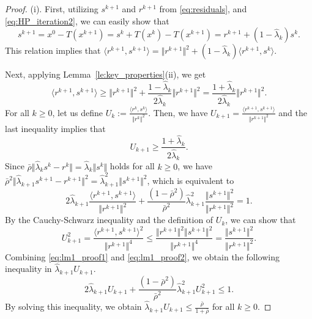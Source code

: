 \documentclass{article}
\theoremstyle{plain}
\theoremstyle{definition}
\newcommand{\norms}[1]{\Vert#1\Vert}
\newcommand{\iprods}[1]{\langle #1\rangle}
\newcommand{\0}{\boldsymbol{0}}
\begin{document}
\begin{proof}
(i). First, utilizing $s^{k+1}$ and $r^{k+1}$ from \eqref{eq:residuals}, and \eqref{eq:HP_iteration2}, we can easily show that
\begin{equation*}
s^{k+1} = x^0 - T(x^{k+1})  = s^k + T(x^k) - T(x^{k+1})  = r^{k+1} + (1 - \hat{\lambda}_k)s^k.
\end{equation*}	
This relation implies that $\iprods{ r^{k+1}, s^{k+1} } = \norms{ r^{k+1} }^2 + (1 - \hat{\lambda}_k)\iprods{ r^{k+1}, s^k}$.

Next, applying Lemma~\ref{le:key_properties}(ii), we get
\begin{equation*}
\iprods{ r^{k+1}, s^{k+1} }  \geq \norms{ r^{k+1} }^2 + \frac{1 - \hat{\lambda}_k}{ 2 \hat{\lambda}_k} \norms{ r^{k+1} }^2 = \frac{1 + \hat{\lambda}_k}{2\hat{\lambda}_k} \norms{ r^{k+1} }^2.
\end{equation*}
For all $k \geq 0$, let us define $U_k := \frac{\iprods{r^k, s^k}}{\norms{r^k}^2}$.
Then, we have $U_{k+1} = \frac{ \iprods{ r^{k+1}, s^{k+1} }}{ \norms{ r^{k+1} }^2 }$ and the last inequality implies that
\begin{equation}\label{eq:B_k}
U_{k+1}	\ge \frac{1 + \hat{\lambda}_k}{2\hat{\lambda}_k}.
\end{equation}
Since $\bar{\rho} \norms{\hat{\lambda}_ks^k - r^k}  = \hat{\lambda}_k\norms{s^k}$ holds for all $k \geq 0$, we have $\bar{\rho}^2\norms{\hat{\lambda}_{k+1}s^{k+1} - r^{k+1} }^2 = \hat{\lambda}_{k+1}^2\norms{s^{k+1}}^2$, which is equivalent to
\begin{equation}\label{eq:lm1_proof1}
2\hat{\lambda}_{k+1}\frac{\iprods{ r^{k+1}, s^{k+1} } }{\norms{ r^{k+1} }^2}  + \frac{(1 - \bar{\rho}^2)}{ \bar{\rho}^2} \hat{\lambda}_{k+1}^2\frac{\norms{ s^{k+1} }^2}{\norms{ r^{k+1}}^2 } = 1.
\end{equation}
By the Cauchy-Schwarz inequality and the definition of $U_k$, we can show that
\begin{equation}\label{eq:lm1_proof2}
U^2_{k+1} = \frac{\iprods{ r^{k+1}, s^{k+1}}^2}{\norms{ r^{k+1} }^4} \leq \frac{\norms{ r^{k+1}}^2 \norms{ s^{k+1}}^2}{\norms{ r^{k+1}}^4} = \frac{\norms{ s^{k+1}}^2}{\norms{ r^{k+1}}^2}.
\end{equation}
Combining \eqref{eq:lm1_proof1} and \eqref{eq:lm1_proof2}, we obtain the following inequality in $\hat{\lambda}_{k+1}U_{k+1}$.
\begin{equation*} 
2\hat{\lambda}_{k+1}U_{k+1} + \frac{(1 - \bar{\rho}^2)}{\bar{\rho}^2}  \hat{\lambda}_{k+1}^2U_{k+1}^2 \leq 1.
\end{equation*}
By solving this inequality, we obtain $\hat{\lambda}_{k+1}U_{k+1} \leq \frac{\bar{\rho}}{1+ \bar{\rho}}$ for all $k \geq 0$.  


\end{proof}
\end{document}
